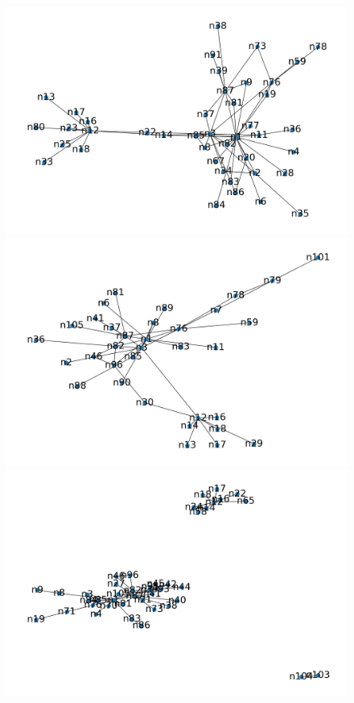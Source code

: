 \begin{figure}[htbp]
	\centering
	\begin{minipage}{.32\textwidth}
		\centering
		\includegraphics[width=1\linewidth]{problem_02/network_labels_phase8}
	\end{minipage}
	\begin{minipage}{.32\textwidth}
		\centering
		\includegraphics[width=1\linewidth]{problem_02/network_labels_phase9}
	\end{minipage}
	\begin{minipage}{.32\textwidth}
		\centering
		\includegraphics[width=1\linewidth]{problem_02/network_labels_phase10}

\end{minipage}
\end{figure}
